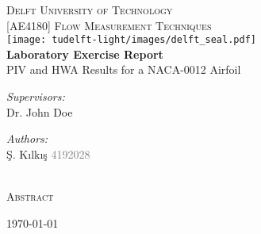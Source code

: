 
\begin{titlepage}
\begin{center}

\textsc{\LARGE Delft University of Technology}\\[0.25cm]
\textsc{\normalsize [AE4180] Flow Measurement Techniques}\\[1.5cm]
\texttt{[image: tudelft-light/images/delft\_seal.pdf]}\\[1.5cm]
{\huge \bfseries Laboratory Exercise Report} \\
\huge  PIV and HWA Results for a NACA-0012 Airfoil \\[1.0cm]

\begin{minipage}[t]{0.4\textwidth}
\begin{flushleft} \large
\emph{Supervisors:}\\
    Dr. John Doe\\
    

\end{flushleft}
\end{minipage}
\begin{minipage}[t]{0.4\textwidth}
\begin{flushright} \large
\emph{Authors:}\\
    \c{S}. K{\i}lk{\i}\c{s} \textcolor{gray}{4192028}\\
    
\end{flushright}
\end{minipage}\\[2.0cm]

\large \textsc{Abstract}

\begin{minipage}[t]{0.8\textwidth} \large



\end{minipage}

\vfill

\small{\today}


\end{center}
\end{titlepage}
\restoregeometry